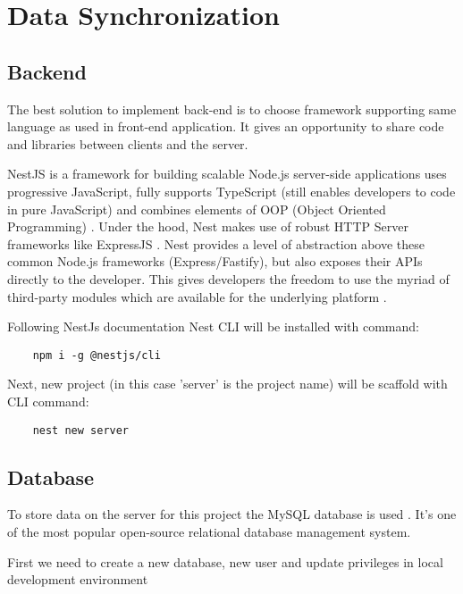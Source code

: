 \chapter{{Data Synchronization}}%
\label{ch:synchronisation}


\section{{Backend}}%
\label{sec:backend}
The best solution to implement back-end is to choose framework supporting same language as used in front-end application. It gives an opportunity to share code and libraries between clients and the server.

\begin{displayquote}
    NestJS is a framework for building scalable Node.js server-side applications uses progressive JavaScript,  fully supports TypeScript (still enables developers to code in pure JavaScript) and combines elements of OOP (Object Oriented Programming) \autocite{NyakundiOOP}. Under the hood, Nest makes use of robust HTTP Server frameworks like ExpressJS \autocite{ExpressJS}. 
    Nest provides a level of abstraction above these common Node.js frameworks (Express/Fastify), but also exposes their APIs directly to the developer. This gives developers the freedom to use the myriad of third-party modules which are available for the underlying platform \autocite{NestJsDoc}.
\end{displayquote}

Following NestJs documentation Nest CLI will be installed with command:
\begin{verbatim}
    npm i -g @nestjs/cli
\end{verbatim}

Next, new project (in this case 'server' is the project name) will be scaffold with CLI command:
\begin{verbatim}
    nest new server
\end{verbatim}



\section{{Database}}%
\label{sec:database}

To store data on the server for this project the MySQL database is used \autocite{MySQL}. It's one of the most popular open-source relational database management system.

First we need to create a new database, new user and update privileges in local development environment

